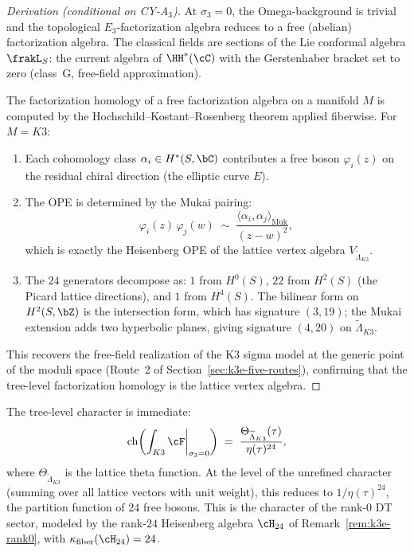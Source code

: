 \begin{proof}[Derivation (conditional on CY-A$_3$)]
At $\sigma_3 = 0$, the Omega-background is trivial and the
topological $E_3$-factorization algebra reduces to a free (abelian)
factorization algebra. The classical fields are sections of
the Lie conformal algebra $\frakL_S$: the current algebra of
$\HH^*(\cC)$ with the Gerstenhaber bracket set to zero
(class~G, free-field approximation).

The factorization homology of a free factorization algebra
on a manifold $M$ is computed by the Hochschild--Kostant--Rosenberg
theorem applied fiberwise. For $M = K3$:
\begin{enumerate}[label=(\roman*)]
\item Each cohomology class
$\alpha_i \in H^*(S, \bC)$ contributes a free boson $\varphi_i(z)$
on the residual chiral direction (the elliptic curve $E$).
\item The OPE is determined by the Mukai pairing:
\[
  \varphi_i(z)\, \varphi_j(w)
  \;\sim\;
  \frac{\langle \alpha_i, \alpha_j \rangle_{\mathrm{Muk}}}{(z - w)^2},
\]
which is exactly the Heisenberg OPE of the lattice vertex algebra
$V_{\widetilde{\Lambda}_{K3}}$.
\item The $24$ generators decompose as:
$1$ from $H^0(S)$, $22$ from $H^2(S)$ (the Picard lattice
directions), and $1$ from $H^4(S)$. The bilinear form on
$H^2(S, \bZ)$ is the intersection form, which has
signature $(3,19)$; the Mukai extension adds two hyperbolic
planes, giving signature $(4,20)$ on $\widetilde{\Lambda}_{K3}$.
\end{enumerate}
This recovers the free-field realization of the K3 sigma model
at the generic point of the moduli space (Route~2 of
Section~\ref{sec:k3e-five-routes}), confirming that the tree-level
factorization homology is the lattice vertex algebra.
\end{proof}

The tree-level character is immediate:
\begin{equation}\label{eq:k3-fact-tree-char}
  \operatorname{ch}\biggl(\int_{K3} \cF\bigg|_{\sigma_3 = 0}\biggr)
  \;=\;
  \frac{\Theta_{\widetilde{\Lambda}_{K3}}(\tau)}{\eta(\tau)^{24}},
\end{equation}
where $\Theta_{\widetilde{\Lambda}_{K3}}$ is the lattice theta
function. At the level of the unrefined character (summing over
all lattice vectors with unit weight), this reduces to
$1/\eta(\tau)^{24}$, the partition function of $24$ free bosons.
This is the character of the rank-$0$ DT sector, modeled by the
rank-$24$ Heisenberg algebra $\cH_{24}$ of Remark~\ref{rem:k3e-rank0}, with
$\kappa_{\mathrm{fiber}}(\cH_{24}) = 24$.

